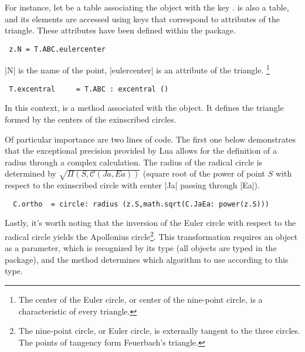 For instance, let  be a table associating the object  with the key .  is also a table, and its elements are accessed using keys that correspond to attributes of the triangle. These attributes have been defined within the package.

\vspace{1em}
\begin{mybox}
\begin{Verbatim}
 z.N = T.ABC.eulercenter 
\end{Verbatim}
\end{mybox}

|N| is the name of the point, |eulercenter| is an attribute of the triangle.
\footnote{ The center of the Euler circle, or center of the nine-point circle, is a characteristic of every triangle.}

\begin{mybox}
\begin{Verbatim}
 T.excentral     = T.ABC : excentral () 
\end{Verbatim}
\end{mybox}

In this context,  is a method associated with the object. It defines the triangle formed by the centers of the exinscribed circles. 

Of particular importance are two lines of code. The first one below demonstrates that the exceptional precision provided by Lua allows for the definition of a radius through a complex calculation.  The radius of the radical circle is determined by $\sqrt{\Pi(S,\mathcal{C}(Ja,Ea))}$ (square root of the power of point $S$ with respect to the exinscribed circle with center |Ja| passing through |Ea|). 

\begin{mybox}{}
\begin{Verbatim}
  C.ortho  = circle: radius (z.S,math.sqrt(C.JaEa: power(z.S)))
\end{Verbatim}
\end{mybox}

Lastly, it's worth noting that the inversion of the Euler circle with respect to the radical circle yields the Apollonius circle\footnote{The nine-point circle, or Euler circle, is externally tangent to the three circles. The points of tangency form Feuerbach's triangle.}. This transformation requires an object as a parameter, which is recognized by its type (all objects are typed in the package), and the method determines which algorithm to use according to this type.

